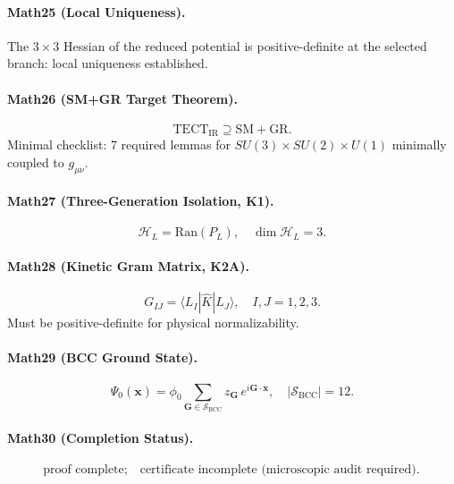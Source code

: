 \documentclass[11pt,a4paper]{article}
\newcommand{\HilL}{\mathcal{H}_{L}}
\begin{document}
\paragraph{Math25 (Local Uniqueness).}
The $3\times3$ Hessian of the reduced potential is positive-definite
at the selected branch: local uniqueness established.

\paragraph{Math26 (SM+GR Target Theorem).}
\begin{equation}
\boxed{\mathrm{TECT}_{\mathrm{IR}}\supseteq\mathrm{SM}+\mathrm{GR}.}
\end{equation}
Minimal checklist: 7 required lemmas for $SU(3)\times SU(2)\times U(1)$
minimally coupled to $g_{\mu\nu}$.

\paragraph{Math27 (Three-Generation Isolation, K1).}
\begin{equation}
\HilL=\mathrm{Ran}(P_{L}),\quad\dim\HilL=3.
\end{equation}

\paragraph{Math28 (Kinetic Gram Matrix, K2A).}
\begin{equation}
G_{IJ}=\langle L_{I}|\hat{K}|L_{J}\rangle,\quad I,J=1,2,3.
\end{equation}
Must be positive-definite for physical normalizability.

\paragraph{Math29 (BCC Ground State).}
\begin{equation}
\Psi_{0}(\mathbf{x})=\phi_{0}\!\!\sum_{\mathbf{G}\in\mathcal{S}_{\mathrm{BCC}}}
\!\!z_{\mathbf{G}}\,e^{i\mathbf{G}\cdot\mathbf{x}},\quad
|\mathcal{S}_{\mathrm{BCC}}|=12.
\end{equation}

\paragraph{Math30 (Completion Status).}
\begin{equation}
\boxed{\text{proof complete};\quad
\text{certificate incomplete (microscopic audit required).}}
\end{equation}
\end{document}
